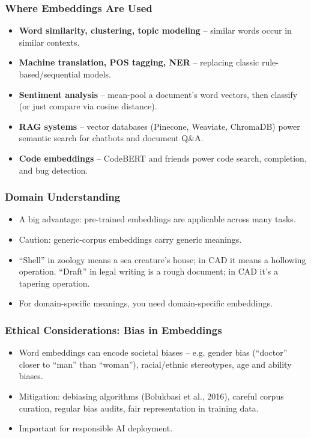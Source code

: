 \begin{frame}[fragile]\frametitle{Where Embeddings Are Used}
	\begin{itemize}
	\item \textbf{Word similarity, clustering, topic modeling} -- similar words occur in similar contexts.
	\item \textbf{Machine translation, POS tagging, NER} -- replacing classic rule-based/sequential models.
	\item \textbf{Sentiment analysis} -- mean-pool a document's word vectors, then classify (or just compare via cosine distance).
	\item \textbf{RAG systems} -- vector databases (Pinecone, Weaviate, ChromaDB) power semantic search for chatbots and document Q\&A.
	\item \textbf{Code embeddings} -- CodeBERT and friends power code search, completion, and bug detection.
	\end{itemize}
\end{frame}

\begin{frame}[fragile]\frametitle{Domain Understanding}
	\begin{itemize}
	\item A big advantage: pre-trained embeddings are applicable across many tasks.
	\item Caution: generic-corpus embeddings carry generic meanings.
	\item ``Shell'' in zoology means a sea creature's house; in CAD it means a hollowing operation. ``Draft'' in legal writing is a rough document; in CAD it's a tapering operation.
	\item For domain-specific meanings, you need domain-specific embeddings.
	\end{itemize}
\end{frame}

\begin{frame}[fragile]\frametitle{Ethical Considerations: Bias in Embeddings}
	\begin{itemize}
	\item Word embeddings can encode societal biases -- e.g. gender bias (``doctor'' closer to ``man'' than ``woman''), racial/ethnic stereotypes, age and ability biases.
	\item Mitigation: debiasing algorithms (Bolukbasi et al., 2016), careful corpus curation, regular bias audits, fair representation in training data.
	\item Important for responsible AI deployment.
	\end{itemize}
\end{frame}

